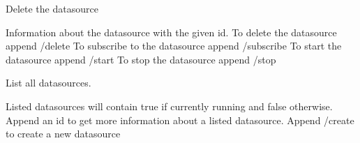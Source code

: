 \documentclass[letterpaper,10pt,english]{sphinxmanual}
\begin{document}

\begin{fulllineitems}
\label{\detokenize{src.datasources:src.datasources.views.datasource_delete}}
Delete the datasource

\end{fulllineitems}


\begin{fulllineitems}
\label{\detokenize{src.datasources:src.datasources.views.datasource_detail}}
Information about the datasource with the given id.
To delete the datasource append /delete
To subscribe to the datasource append /subscribe
To start the datasource append /start
To stop the datasource append /stop

\end{fulllineitems}


\begin{fulllineitems}
\label{\detokenize{src.datasources:src.datasources.views.datasource_list}}
List all datasources.

Listed datasources will contain true if currently running and false otherwise.
Append an id to get more information about a listed datasource.
Append /create to create a new datasource

\end{fulllineitems}

\end{document}
